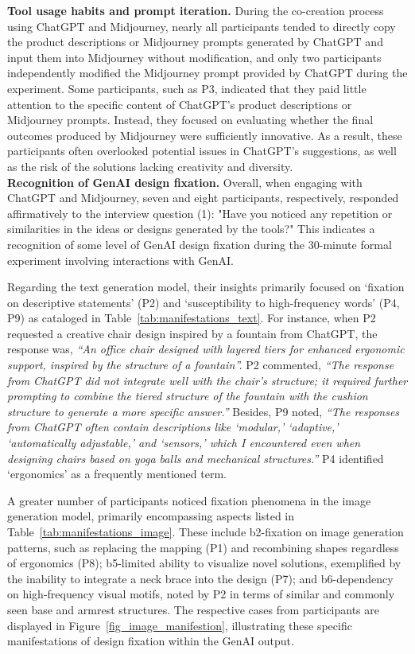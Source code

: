 \textbf{Tool usage habits and prompt iteration.}
During the co-creation process using ChatGPT and Midjourney, nearly all participants tended to directly copy the product descriptions or Midjourney prompts generated by ChatGPT and input them into Midjourney without modification, and only two participants independently modified the Midjourney prompt provided by ChatGPT during the experiment. Some participants, such as P3, indicated that they paid little attention to the specific content of ChatGPT's product descriptions or Midjourney prompts. Instead, they focused on evaluating whether the final outcomes produced by Midjourney were sufficiently innovative. As a result, these participants often overlooked potential issues in ChatGPT's suggestions, as well as the risk of the solutions lacking creativity and diversity.\\

\textbf{Recognition of GenAI design fixation.}
Overall, when engaging with ChatGPT and Midjourney, seven and eight participants, respectively, responded affirmatively to the interview question (1): "Have you noticed any repetition or similarities in the ideas or designs generated by the tools?" This indicates a recognition of some level of GenAI design fixation during the 30-minute formal experiment involving interactions with GenAI.

Regarding the text generation model, their insights primarily focused on ‘fixation on descriptive statements’ (P2) and ‘susceptibility to high-frequency words’ (P4, P9) as cataloged in Table~\ref{tab:manifestations_text}. For instance, when P2 requested a creative chair design inspired by a fountain from ChatGPT, the response was, \textit{“An office chair designed with layered tiers for enhanced ergonomic support, inspired by the structure of a fountain”.} P2 commented, \textit{“The response from ChatGPT did not integrate well with the chair’s structure; it required further prompting to combine the tiered structure of the fountain with the cushion structure to generate a more specific answer.”} Besides, P9 noted, \textit{“The responses from ChatGPT often contain descriptions like ‘modular,’ ‘adaptive,’ ‘automatically adjustable,’ and ‘sensors,’ which I encountered even when designing chairs based on yoga balls and mechanical structures.”} P4 identified ‘ergonomics’ as a frequently mentioned term.

A greater number of participants noticed fixation phenomena in the image generation model, primarily encompassing aspects listed in Table~\ref{tab:manifestations_image}. These include b2-fixation on image generation patterns, such as replacing the mapping (P1) and recombining shapes regardless of ergonomics (P8); b5-limited ability to visualize novel solutions, exemplified by the inability to integrate a neck brace into the design (P7); and b6-dependency on high-frequency visual motifs, noted by P2 in terms of similar and commonly seen base and armrest structures. The respective cases from participants are displayed in Figure~\ref{fig_image_manifestion}, illustrating these specific manifestations of design fixation within the GenAI output.\\

